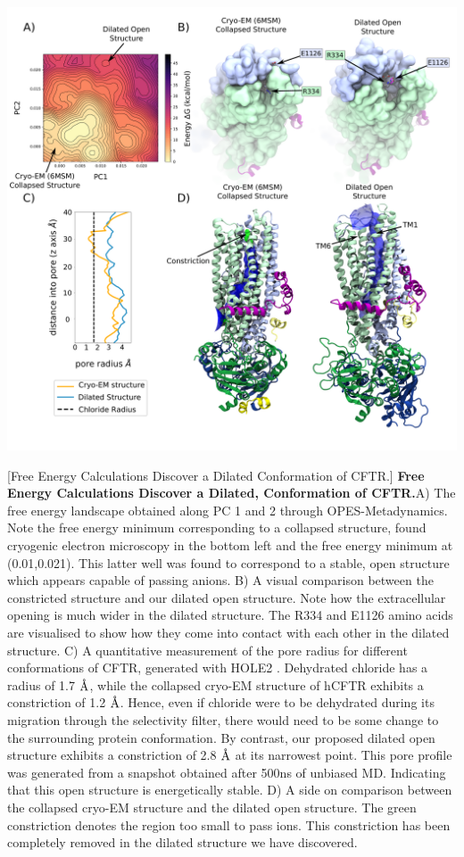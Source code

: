 	\begin{center}
		\includegraphics[width=1\textwidth]{figures/opening/summary_dilated_structure_1.pdf}
	\end{center}
	\begingroup
	\captionsetup{singlelinecheck = false, justification=raggedright}
	[Free Energy Calculations Discover a Dilated Conformation of CFTR.] {\textbf{Free Energy Calculations Discover a Dilated, Conformation of CFTR.}}{A) The free energy landscape obtained along PC 1 and 2 through OPES-Metadynamics. Note the free energy minimum corresponding to a collapsed structure, found cryogenic electron microscopy in the bottom left and the free energy minimum at (0.01,0.021). This latter well was found to correspond to a stable, open structure which appears capable of passing anions. B) A visual comparison between the constricted structure and our dilated open structure. Note how the extracellular opening is much wider in the dilated structure. The R334 and E1126 amino acids are visualised to show how they come into contact with each other in the dilated structure. C) A quantitative measurement of the pore radius for different conformations of CFTR, generated with HOLE2 \cite{smart1996}. Dehydrated chloride has a radius of 1.7 $\textup{\AA}$, while the collapsed cryo-EM structure of hCFTR exhibits a constriction of 1.2 $\textup{\AA}$. Hence, even if chloride were to be dehydrated during its migration through the selectivity filter, there would need to be some change to the surrounding protein conformation. By contrast, our proposed dilated open structure exhibits a constriction of 2.8 $\textup{\AA}$ at its narrowest point. This pore profile was generated from a snapshot obtained after 500ns of unbiased MD. Indicating that this open structure is energetically stable.  D) A side on comparison between the collapsed cryo-EM structure and the dilated open structure. The green constriction denotes the region too small to pass ions. This constriction has been completely removed in the dilated structure we have discovered. }
	\label{summary_FES}
	\endgroup


